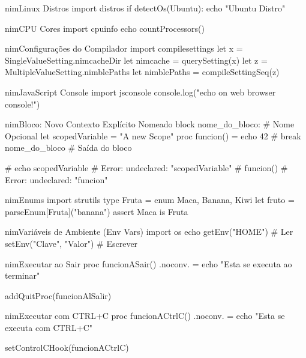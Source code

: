 \documentclass[10pt, a4paper]{article}
\begin{document}
\begin{multicols}{4}
\begin{codebox}{nim}{Linux Distros}
import distros
if detectOs(Ubuntu): echo "Ubuntu Distro"
\end{codebox}


\begin{codebox}{nim}{CPU Cores}
import cpuinfo
echo countProcessors()
\end{codebox}


\begin{codebox}{nim}{Configurações do Compilador}
import compilesettings
let x = SingleValueSetting.nimcacheDir
let nimcache = querySetting(x)
let z = MultipleValueSetting.nimblePaths
let nimblePaths = compileSettingSeq(z)
\end{codebox}


\begin{codebox}{nim}{JavaScript Console}
import jsconsole
console.log("echo on web browser console!")
\end{codebox}


\begin{codebox}{nim}{Bloco: Novo Contexto Explícito Nomeado}
block nome_do_bloco: # Nome Opcional
  let scopedVariable = "A new Scope"
  proc funcion() = echo 42
  # break nome_do_bloco # Saída do bloco

# echo scopedVariable
# Error: undeclared: "scopedVariable"
# funcion()
# Error: undeclared: "funcion"
\end{codebox}


\begin{codebox}{nim}{Enums}
import strutils
type Fruta = enum Maca, Banana, Kiwi
let fruto = parseEnum[Fruta]("banana")
assert Maca is Fruta
\end{codebox}


\begin{codebox}{nim}{Variáveis de Ambiente (Env Vars)}
import os
echo getEnv("HOME") # Ler
setEnv("Clave", "Valor") # Escrever
\end{codebox}


\begin{codebox}{nim}{Executar ao Sair}
proc funcionASair() {.noconv.} =
  echo "Esta se executa ao terminar"

addQuitProc(funcionAlSalir)
\end{codebox}


\begin{codebox}{nim}{Executar com CTRL+C}
proc funcionACtrlC() {.noconv.} =
  echo "Esta se executa com CTRL+C"

setControlCHook(funcionACtrlC)
\end{codebox}



\end{multicols}
\end{document}
